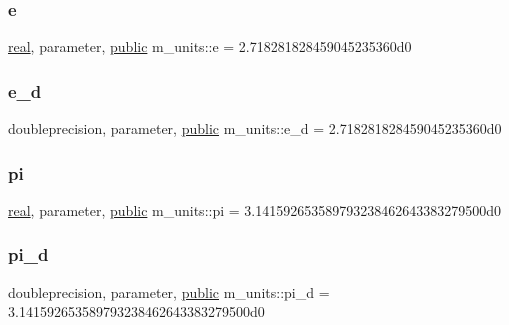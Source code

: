 \mbox{\label{namespacem__units_a14ea25237dbdbd5c868d2729c67b2abd}} 
\subsubsection{\texorpdfstring{e}{e}}
{\footnotesize\ttfamily \hyperlink{read__watch_83_8txt_abdb62bde002f38ef75f810d3a905a823}{real}, parameter, \hyperlink{M__stopwatch_83_8txt_a2f74811300c361e53b430611a7d1769f}{public} m\+\_\+units\+::e = 2.\+718281828459045235360d0}

\mbox{\label{namespacem__units_a758f857fe2277b6576ffae5654544405}} 
\subsubsection{\texorpdfstring{e\+\_\+d}{e\_d}}
{\footnotesize\ttfamily doubleprecision, parameter, \hyperlink{M__stopwatch_83_8txt_a2f74811300c361e53b430611a7d1769f}{public} m\+\_\+units\+::e\+\_\+d = 2.\+718281828459045235360d0}

\mbox{\label{namespacem__units_a7f9e69ec2fe4e5a5c49f7dce15a48a67}} 
\subsubsection{\texorpdfstring{pi}{pi}}
{\footnotesize\ttfamily \hyperlink{read__watch_83_8txt_abdb62bde002f38ef75f810d3a905a823}{real}, parameter, \hyperlink{M__stopwatch_83_8txt_a2f74811300c361e53b430611a7d1769f}{public} m\+\_\+units\+::pi = 3.\+141592653589793238462643383279500d0}

\mbox{\label{namespacem__units_a4c458c5da447708cb6e03ec4c3469dcd}} 
\subsubsection{\texorpdfstring{pi\+\_\+d}{pi\_d}}
{\footnotesize\ttfamily doubleprecision, parameter, \hyperlink{M__stopwatch_83_8txt_a2f74811300c361e53b430611a7d1769f}{public} m\+\_\+units\+::pi\+\_\+d = 3.\+141592653589793238462643383279500d0}

